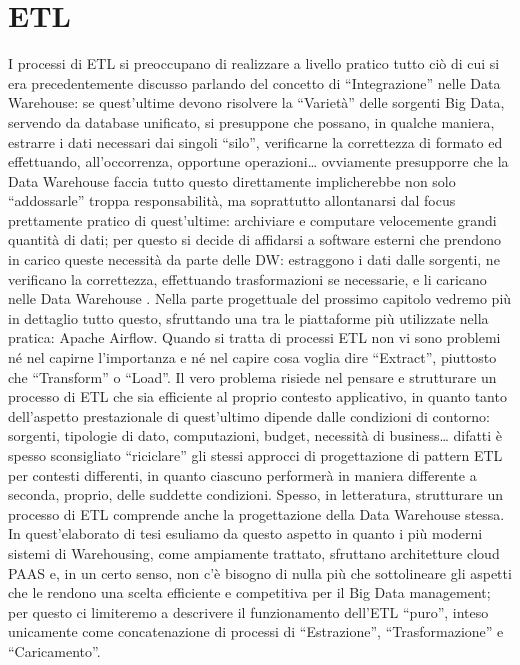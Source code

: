 \documentclass[a4paper,12pt]{report}
\begin{document}
\section{ETL}
I processi di ETL si preoccupano di realizzare a livello pratico tutto ciò di cui si era precedentemente discusso parlando del concetto di “Integrazione” nelle Data Warehouse: se quest’ultime devono risolvere la “Varietà” delle sorgenti Big Data, servendo da database unificato, si presuppone che possano, in qualche maniera, estrarre i dati necessari dai singoli “silo”, verificarne la correttezza di formato ed effettuando, all’occorrenza, opportune operazioni… ovviamente presupporre che la Data Warehouse faccia tutto questo direttamente implicherebbe non solo “addossarle” troppa responsabilità, ma soprattutto allontanarsi dal focus prettamente pratico di quest’ultime: archiviare e computare velocemente grandi quantità di dati; per questo si decide di affidarsi a software esterni che prendono in carico queste necessità da parte delle DW: estraggono i dati dalle sorgenti, ne verificano la correttezza, effettuando trasformazioni se necessarie, e li caricano nelle Data Warehouse . Nella parte progettuale del prossimo capitolo vedremo più in dettaglio tutto questo, sfruttando una tra le piattaforme più utilizzate nella pratica: Apache Airflow.
\noindent
Quando si tratta di processi ETL non vi sono problemi né nel capirne l’importanza e né nel capire cosa voglia dire “Extract”, piuttosto che “Transform” o “Load”. Il vero problema risiede nel pensare e strutturare un processo di ETL che sia efficiente al proprio contesto applicativo, in quanto tanto dell’aspetto prestazionale di quest’ultimo dipende dalle condizioni di contorno: sorgenti, tipologie di dato, computazioni, budget, necessità di business… difatti è spesso sconsigliato “riciclare” gli stessi approcci di progettazione di pattern ETL per contesti differenti, in quanto ciascuno performerà in maniera differente a seconda, proprio, delle suddette condizioni.
\noindent
Spesso, in letteratura, strutturare un processo di ETL comprende anche la progettazione della Data Warehouse  stessa. In quest’elaborato di tesi esuliamo da questo aspetto in quanto i più moderni sistemi di Warehousing, come ampiamente trattato, sfruttano architetture cloud PAAS e, in un certo senso, non c’è bisogno di nulla più che sottolineare gli aspetti che le rendono una scelta efficiente e competitiva per il Big Data management; per questo ci limiteremo a descrivere il funzionamento dell’ETL “puro”, inteso unicamente come concatenazione di processi di “Estrazione”, “Trasformazione” e “Caricamento”.
\end{document}

